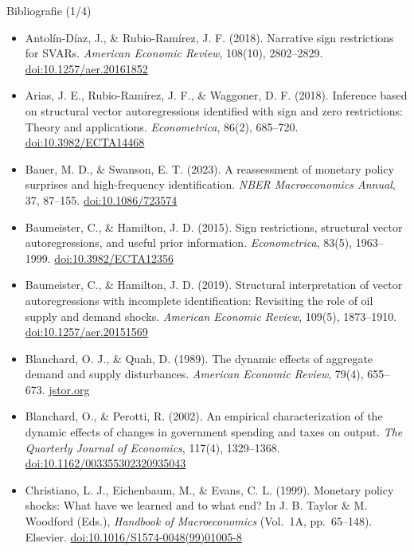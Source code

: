 \begin{frame}{Bibliografie (1/4)}
\itemsize{\tiny}
\begin{itemize}
    \item Antolín-Díaz, J., \& Rubio-Ramírez, J. F. (2018). Narrative sign restrictions for SVARs. \textit{American Economic Review}, 108(10), 2802--2829. \href{https://doi.org/10.1257/aer.20161852}{doi:10.1257/aer.20161852}
    \item Arias, J. E., Rubio-Ramírez, J. F., \& Waggoner, D. F. (2018). Inference based on structural vector autoregressions identified with sign and zero restrictions: Theory and applications. \textit{Econometrica}, 86(2), 685--720. \href{https://doi.org/10.3982/ECTA14468}{doi:10.3982/ECTA14468}
    \item Bauer, M. D., \& Swanson, E. T. (2023). A reassessment of monetary policy surprises and high-frequency identification. \textit{NBER Macroeconomics Annual}, 37, 87--155. \href{https://doi.org/10.1086/723574}{doi:10.1086/723574}
    \item Baumeister, C., \& Hamilton, J. D. (2015). Sign restrictions, structural vector autoregressions, and useful prior information. \textit{Econometrica}, 83(5), 1963--1999. \href{https://doi.org/10.3982/ECTA12356}{doi:10.3982/ECTA12356}
    \item Baumeister, C., \& Hamilton, J. D. (2019). Structural interpretation of vector autoregressions with incomplete identification: Revisiting the role of oil supply and demand shocks. \textit{American Economic Review}, 109(5), 1873--1910. \href{https://doi.org/10.1257/aer.20151569}{doi:10.1257/aer.20151569}
    \item Blanchard, O. J., \& Quah, D. (1989). The dynamic effects of aggregate demand and supply disturbances. \textit{American Economic Review}, 79(4), 655--673. \href{https://www.jstor.org/stable/1827924}{jstor.org}
    \item Blanchard, O., \& Perotti, R. (2002). An empirical characterization of the dynamic effects of changes in government spending and taxes on output. \textit{The Quarterly Journal of Economics}, 117(4), 1329--1368. \href{https://doi.org/10.1162/003355302320935043}{doi:10.1162/003355302320935043}
    \item Christiano, L. J., Eichenbaum, M., \& Evans, C. L. (1999). Monetary policy shocks: What have we learned and to what end? In J. B. Taylor \& M. Woodford (Eds.), \textit{Handbook of Macroeconomics} (Vol.\ 1A, pp.\ 65--148). Elsevier. \href{https://doi.org/10.1016/S1574-0048(99)01005-8}{doi:10.1016/S1574-0048(99)01005-8}

\end{itemize}
\end{frame}
